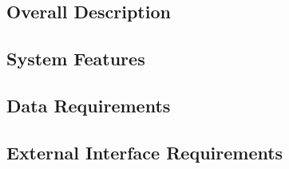     \subsection{Overall Description}
        

    \subsection{System Features}
        

    \subsection{Data Requirements}
    

    \subsection{External Interface Requirements}
        






